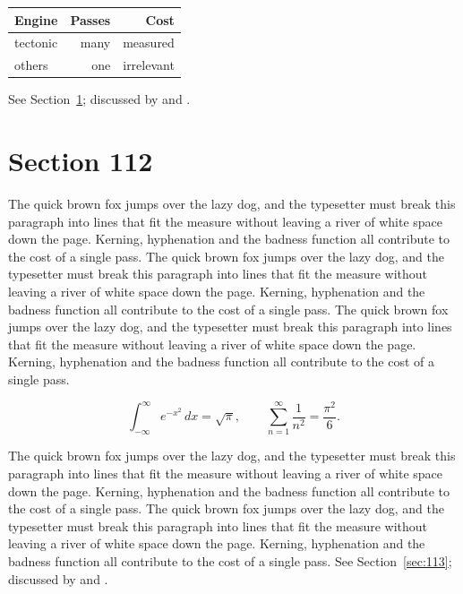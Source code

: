 \documentclass{article}
\begin{document}
\begin{center}
\begin{tabular}{lrr}
\toprule
Engine & Passes & Cost \\
\midrule
tectonic & many & measured \\
others & one & irrelevant \\
\bottomrule
\end{tabular}
\end{center}

See Section~\ref{sec:112}; discussed by \textcite{k2} and \textcite{l4}.
\section{Section 112}
\label{sec:112}
The quick brown fox jumps over the lazy dog, and the typesetter must break this paragraph into lines that fit the measure without leaving a river of white space down the page. Kerning, hyphenation and the badness function all contribute to the cost of a single pass. The quick brown fox jumps over the lazy dog, and the typesetter must break this paragraph into lines that fit the measure without leaving a river of white space down the page. Kerning, hyphenation and the badness function all contribute to the cost of a single pass. The quick brown fox jumps over the lazy dog, and the typesetter must break this paragraph into lines that fit the measure without leaving a river of white space down the page. Kerning, hyphenation and the badness function all contribute to the cost of a single pass. 

\begin{equation}\label{eq:112}
\int_{-\infty}^{\infty} e^{-x^{2}}\,dx = \sqrt{\pi}, \qquad
\sum_{n=1}^{\infty} \frac{1}{n^{2}} = \frac{\pi^{2}}{6}.
\end{equation}

The quick brown fox jumps over the lazy dog, and the typesetter must break this paragraph into lines that fit the measure without leaving a river of white space down the page. Kerning, hyphenation and the badness function all contribute to the cost of a single pass. The quick brown fox jumps over the lazy dog, and the typesetter must break this paragraph into lines that fit the measure without leaving a river of white space down the page. Kerning, hyphenation and the badness function all contribute to the cost of a single pass. 
See Section~\ref{sec:113}; discussed by \textcite{k3} and \textcite{l5}.
\end{document}
